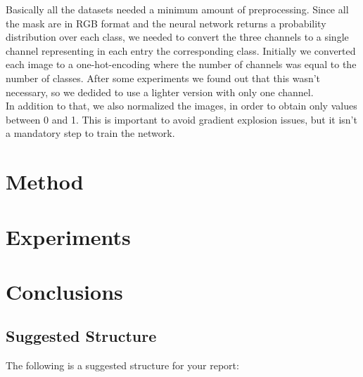 \documentclass[10pt,twocolumn,letterpaper]{article}
\begin{document}
Basically all the datasets needed a minimum amount of preprocessing.
Since all the mask are in RGB format and the neural network returns a probability distribution over each class, we needed to convert the three channels to a single channel representing in each entry the corresponding class. Initially we converted each image to a one-hot-encoding where the number of channels was equal to the number of classes. After some experiments we found out that this wasn't necessary, so we dedided to use a lighter version with only one channel. \\
In addition to that, we also normalized the images, in order to obtain only values between 0 and 1. This is important to avoid gradient explosion issues, but it isn't a mandatory step to train the network.

\section{Method}

\section{Experiments}

\section{Conclusions}

\subsection{Suggested Structure}

The following is a suggested structure for your report:
\end{document}
